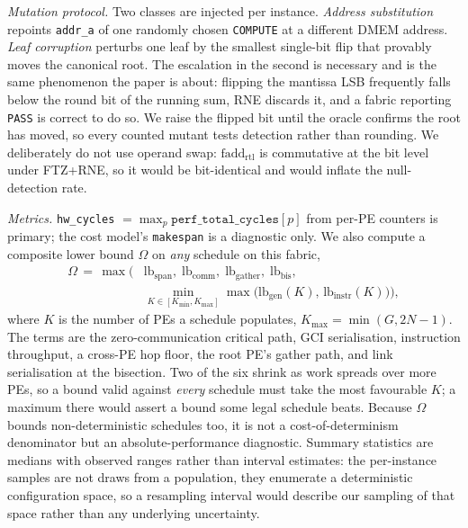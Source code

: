 \documentclass[journal,10pt]{IEEEtran}
\theoremstyle{plain}
\theoremstyle{definition}
\theoremstyle{remark}
\newcommand{\fadd}{\ensuremath{\mathrm{fadd}_{\mathrm{rtl}}}}
\newcommand{\sv}[1]{\texttt{#1}}
\begin{document}
\emph{Mutation protocol.} Two classes are injected per instance.
\emph{Address substitution} repoints \texttt{addr\_a} of one randomly chosen
\texttt{COMPUTE} at a different DMEM address. \emph{Leaf corruption} perturbs
one leaf by the smallest single-bit flip that provably moves the canonical
root. The escalation in the second is necessary and is the same phenomenon the
paper is about: flipping the mantissa LSB frequently falls below the round bit
of the running sum, RNE discards it, and a fabric reporting \sv{PASS} is
correct to do so. We raise the flipped bit until the oracle confirms the root
has moved, so every counted mutant tests detection rather than rounding. We
deliberately do not use operand swap: $\fadd$ is commutative at the bit level
under FTZ+RNE, so it would be bit-identical and would inflate the
null-detection rate.

\emph{Metrics.} \sv{hw\_cycles} $= \max_p \sv{perf\_total\_cycles}[p]$ from
per-PE counters is primary; the cost model's \sv{makespan} is a diagnostic
only. We also compute a composite lower bound $\Omega$ on \emph{any} schedule
on this fabric,
\begin{equation}\label{eq:omega}
\begin{split}
\Omega \,=\, \max \bigl(
    & \text{lb}_{\text{span}}, \;
      \text{lb}_{\text{comm}}, \;
      \text{lb}_{\text{gather}}, \;
      \text{lb}_{\text{bis}}, \\
    & \min_{K \in [K_{\min}, K_{\max}]}
      \max \bigl( \text{lb}_{\text{gen}}(K), \, \text{lb}_{\text{instr}}(K) \bigr)
\bigr),
\end{split}
\end{equation}
where $K$ is the number of PEs a schedule populates,
$K_{\max} = \min(G, 2N-1)$. The terms are the zero-communication critical
path, GCI serialisation, instruction throughput, a cross-PE hop floor, the
root PE's gather path, and link serialisation at the bisection. Two of the six
shrink as work spreads over more PEs, so a bound valid against \emph{every}
schedule must take the most favourable $K$; a maximum there would assert a
bound some legal schedule beats. Because $\Omega$ bounds non-deterministic
schedules too, it is not a cost-of-determinism denominator but an
absolute-performance diagnostic. Summary statistics are medians with observed
ranges rather than interval estimates: the per-instance samples are not draws
from a population, they enumerate a deterministic configuration space, so a
resampling interval would describe our sampling of that space rather than any
underlying uncertainty.
\end{document}
